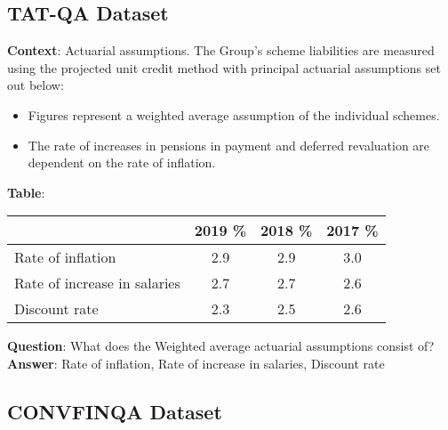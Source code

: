 \documentclass[logo,msc]{infthesis}           %
\begin{document}
\subsection{TAT-QA Dataset}
\begin{tcolorbox}[colback=blue!5!white, %
                 colframe=gray, %
                 fonttitle=\bfseries, %
                 breakable, %
                 sharp corners, %
                 boxsep=10pt, %
                 left=10pt, %
                 right=10pt, %
                 top=10pt, %
                 bottom=10pt, %
                 enlarge left by=-10mm, %
                 enlarge right by=-10mm] %
\textbf{Context}: Actuarial assumptions. The Group’s scheme liabilities are measured using the projected unit credit method with principal actuarial assumptions set out below:
\begin{itemize}
    \item Figures represent a weighted average assumption of the individual schemes.
    \item The rate of increases in pensions in payment and deferred revaluation are dependent on the rate of inflation.
\end{itemize}
\textbf{Table}:
\begin{tabular}{lccc}
    & 2019 \% & 2018 \% & 2017 \% \\
    \hline
    Rate of inflation & 2.9 & 2.9 & 3.0 \\
    Rate of increase in salaries & 2.7 & 2.7 & 2.6 \\
    Discount rate & 2.3 & 2.5 & 2.6 \\
\end{tabular}

\textbf{Question}: What does the Weighted average actuarial assumptions consist of? \\
\textbf{Answer}: Rate of inflation, Rate of increase in salaries, Discount rate
\end{tcolorbox}

\subsection{CONVFINQA Dataset}


\end{document}
